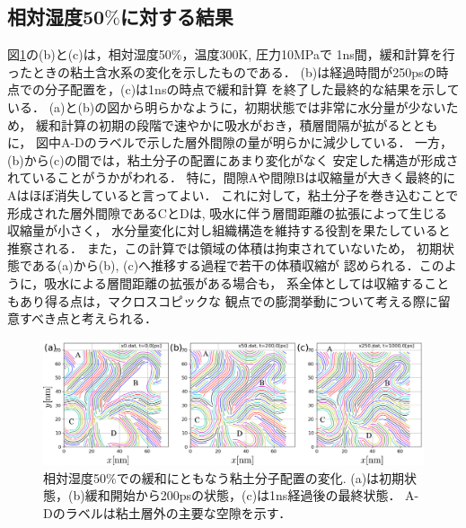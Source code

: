 \subsection{相対湿度50$\%$に対する結果}
図\ref{fig:fig3}の(b)と(c)は，相対湿度50$\%$，温度300K, 圧力10MPaで
1ns間，緩和計算を行ったときの粘土含水系の変化を示したものである．
(b)は経過時間が250psの時点での分子配置を，(c)は1nsの時点で緩和計算
を終了した最終的な結果を示している．
(a)と(b)の図から明らかなように，初期状態では非常に水分量が少ないため，
緩和計算の初期の段階で速やかに吸水がおき，積層間隔が拡がるとともに，
図中A-Dのラベルで示した層外間隙の量が明らかに減少している．
一方，(b)から(c)の間では，粘土分子の配置にあまり変化がなく
安定した構造が形成されていることがうかがわれる．
特に，間隙Aや間隙Bは収縮量が大きく最終的にAはほぼ消失していると言ってよい．
これに対して，粘土分子を巻き込むことで形成された層外間隙であるCとDは,
吸水に伴う層間距離の拡張によって生じる収縮量が小さく，
水分量変化に対し組織構造を維持する役割を果たしていると推察される．
また，この計算では領域の体積は拘束されていないため，
初期状態である(a)から(b), (c)へ推移する過程で若干の体積収縮が
認められる．このように，吸水による層間距離の拡張がある場合も，
系全体としては収縮することもあり得る点は，マクロスコピックな
観点での膨潤挙動について考える際に留意すべき点と考えられる．
\begin{figure}[h]
	\begin{center}
	\includegraphics[width=1.0\linewidth]{Figs/fig3.pdf} 
	\end{center}
	\caption{
		相対湿度50$\%$での緩和にともなう粘土分子配置の変化.  
		(a)は初期状態，(b)緩和開始から200psの状態，(c)は1ns経過後の最終状態．
		A-Dのラベルは粘土層外の主要な空隙を示す．
	} 
	\label{fig:fig3}
\end{figure}
